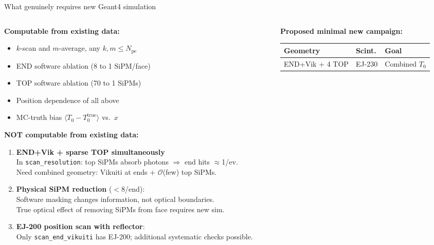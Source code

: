 \documentclass[xcolor=table,aspectratio=169,9pt]{beamer}
\begin{document}
\begin{frame}{What genuinely requires new Geant4 simulation}
\begin{columns}[T]
\begin{column}{0.50\textwidth}
\textbf{Computable from existing data:}\\[0.3em]
\begin{itemize}\footnotesize
  \item $k$-scan and $m$-average, any $k,m \le N_\mathrm{pe}$
  \item END software ablation (8 to 1 SiPM/face)
  \item TOP software ablation (70 to 1 SiPMs)
  \item Position dependence of all above
  \item MC-truth bias $\langle T_0 - T_0^\mathrm{true}\rangle$ vs.\ $x$
\end{itemize}
\vspace{0.5em}
\textbf{NOT computable from existing data:}\\[0.3em]
\begin{enumerate}\footnotesize
  \item \textbf{END+Vik + sparse TOP simultaneously}\\
        In \texttt{scan\_resolution}: top SiPMs absorb photons $\Rightarrow$ end hits $\approx$1/ev.\\
        Need combined geometry: Vikuiti at ends + $\mathcal{O}$(few) top SiPMs.
  \item \textbf{Physical SiPM reduction} ($< 8$/end):\\
        Software masking changes information, not optical boundaries.\\
        True optical effect of removing SiPMs from face requires new sim.
  \item \textbf{EJ-200 position scan with reflector}:\\
        Only \texttt{scan\_end\_vikuiti} has EJ-200; additional systematic checks possible.
\end{enumerate}
\end{column}
\begin{column}{0.46\textwidth}
\textbf{Proposed minimal new campaign:}\\[0.5em]
\footnotesize
\begin{tabular}{lll}
\toprule
Geometry & Scint. & Goal\\
\midrule
END+Vik + 4 TOP & EJ-230 & Combined $T_0$\\

\end{tabular}
\end{column}
\end{columns}
\end{frame}
\end{document}
